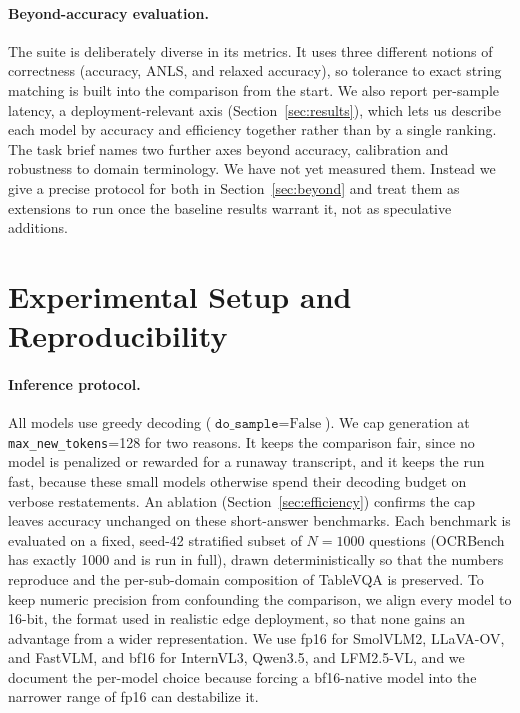 \documentclass{article}
\begin{document}
\paragraph{Beyond-accuracy evaluation.}
The suite is deliberately diverse in its metrics. It uses three different notions
of correctness (accuracy, ANLS, and relaxed accuracy), so tolerance to exact
string matching is built into the comparison from the start. We also report
per-sample latency, a deployment-relevant axis (Section~\ref{sec:results}), which
lets us describe each model by accuracy and efficiency together rather than by a
single ranking. The task brief names two further axes beyond accuracy,
calibration and robustness to domain terminology. We have not yet measured them.
Instead we give a precise protocol for both in Section~\ref{sec:beyond} and treat
them as extensions to run once the baseline results warrant it, not as
speculative additions.

\section{Experimental Setup and Reproducibility}
\label{sec:setup}

\paragraph{Inference protocol.}
All models use greedy decoding ($\texttt{do\_sample}=\text{False}$). We cap
generation at \texttt{max\_new\_tokens}=128 for two reasons. It keeps the
comparison fair, since no model is penalized or rewarded for a runaway
transcript, and it keeps the run fast, because these small models otherwise
spend their decoding budget on verbose restatements. An ablation
(Section~\ref{sec:efficiency}) confirms the cap leaves accuracy unchanged on
these short-answer benchmarks. Each benchmark is evaluated on a fixed, seed-42
stratified subset of $N{=}1000$ questions (OCRBench has exactly 1000 and is run
in full), drawn deterministically so that the numbers reproduce and the
per-sub-domain composition of TableVQA is preserved. To keep numeric precision
from confounding the comparison, we align every model to 16-bit, the format used
in realistic edge deployment, so that none gains an advantage from a wider
representation. We use fp16 for SmolVLM2, LLaVA-OV, and FastVLM, and bf16 for
InternVL3, Qwen3.5, and LFM2.5-VL, and we document the per-model choice because
forcing a bf16-native model into the narrower range of fp16 can destabilize it.
\end{document}
